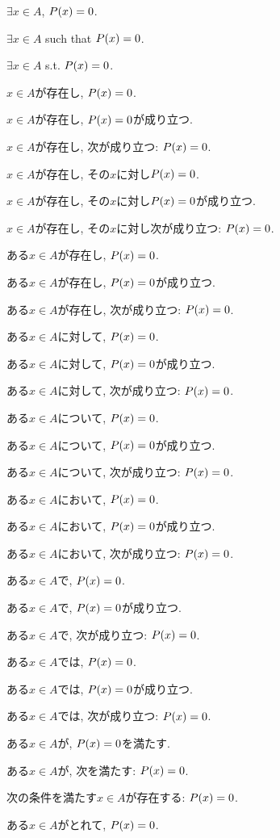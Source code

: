 \item $\exists x \in A$, $P(x)=0$.
\item $\exists x \in A$ such that $P(x)=0$.
\item $\exists x \in A$ s.t. $P(x)=0$.
\item $x\in A$が存在し, $P(x)=0$.
\item $x\in A$が存在し, $P(x)=0$が成り立つ.
\item $x\in A$が存在し, 次が成り立つ: $P(x)=0$.
\item $x\in A$が存在し, その$x$に対し$P(x)=0$.
\item $x\in A$が存在し, その$x$に対し$P(x)=0$が成り立つ.
\item $x\in A$が存在し, その$x$に対し次が成り立つ: $P(x)=0$.
\item ある$x\in A$が存在し, $P(x)=0$.
\item ある$x\in A$が存在し, $P(x)=0$が成り立つ.
\item ある$x\in A$が存在し, 次が成り立つ: $P(x)=0$.
\item ある$x\in A$に対して, $P(x)=0$.
\item ある$x\in A$に対して, $P(x)=0$が成り立つ.
\item ある$x\in A$に対して, 次が成り立つ: $P(x)=0$.
\item ある$x\in A$について, $P(x)=0$.
\item ある$x\in A$について, $P(x)=0$が成り立つ.
\item ある$x\in A$について, 次が成り立つ: $P(x)=0$.
\item ある$x\in A$において, $P(x)=0$.
\item ある$x\in A$において, $P(x)=0$が成り立つ.
\item ある$x\in A$において, 次が成り立つ: $P(x)=0$.
\item ある$x\in A$で, $P(x)=0$.
\item ある$x\in A$で, $P(x)=0$が成り立つ.
\item ある$x\in A$で, 次が成り立つ: $P(x)=0$.
\item ある$x\in A$では, $P(x)=0$.
\item ある$x\in A$では, $P(x)=0$が成り立つ.
\item ある$x\in A$では, 次が成り立つ: $P(x)=0$.
\item ある$x\in A$が, $P(x)=0$を満たす.
\item ある$x\in A$が, 次を満たす: $P(x)=0$.
\item 次の条件を満たす$x\in A$が存在する: $P(x)=0$.
\item ある$x\in A$がとれて, $P(x)=0$.

